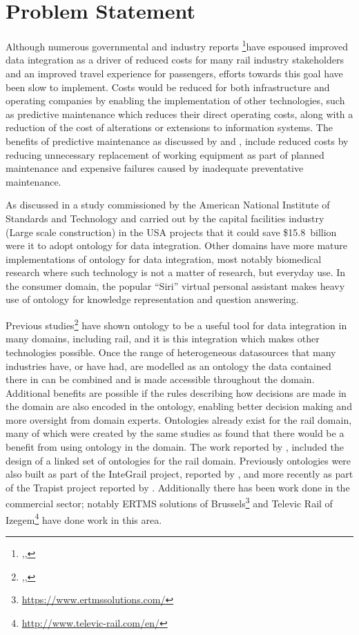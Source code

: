\chapter{Problem Statement}\label{ch:probstate}
Although numerous governmental and industry reports \footnote{\citep{RDG2017},\citep{DepartmentforTransport2011},\citep{TechnicalStrategyLeadershipGroup2012b}}have espoused improved data integration as a driver of reduced costs for many rail industry stakeholders and an improved travel experience for passengers, efforts towards this goal have been slow to implement. Costs would be reduced for both infrastructure and operating companies by enabling the implementation of other technologies, such as predictive maintenance which reduces their direct operating costs, along with a reduction of the cost of alterations or extensions to information systems. The benefits of predictive maintenance as discussed by \citet{QRE:QRE1634} and \citet{RDG2017}, include reduced costs by reducing unnecessary replacement of working equipment as part of planned maintenance and expensive failures caused by inadequate preventative maintenance. 

As discussed in a study commissioned by the American National Institute of Standards and Technology and carried out by \citep{Gallaher2004} the capital facilities industry (Large scale construction) in the USA projects that it could save \$15.8~billion were it to adopt ontology for data integration. Other domains have more mature implementations of ontology for data integration, most notably biomedical research where such technology is not a matter of research, but everyday use. In the consumer domain, the popular ``Siri'' virtual personal assistant makes heavy use of ontology for knowledge representation and question answering.

Previous studies\footnote{\citep{Verstichel2011a},\citep{Tutcher2013},\citep{Morris}} have shown ontology to be a useful tool for data integration in many domains, including rail, and it is this integration which makes other technologies possible. Once the range of heterogeneous datasources that many industries have, or have had, are modelled as an ontology the data contained there in can be combined and is made accessible throughout the domain. Additional benefits are possible if the rules describing how decisions are made in the domain are also encoded in the ontology, enabling better decision making and more oversight from domain experts. Ontologies already exist for the rail domain, many of which were created by the same studies as found that there would be a benefit from using ontology in the domain. The work reported by \citet{Tutcher2015}, included the design of a linked set of ontologies for the rail domain. Previously ontologies were also built as part of the InteGrail project, reported by \citet{Kopf2010}, and more recently as part of the Trapist project reported by \citet{Bhatti2016}. Additionally there has been work done in the commercial sector; notably ERTMS solutions of Brussels\footnote{\url{https://www.ertmssolutions.com/}} and Televic Rail of Izegem\footnote{\url{http://www.televic-rail.com/en/}} have done work in this area.

